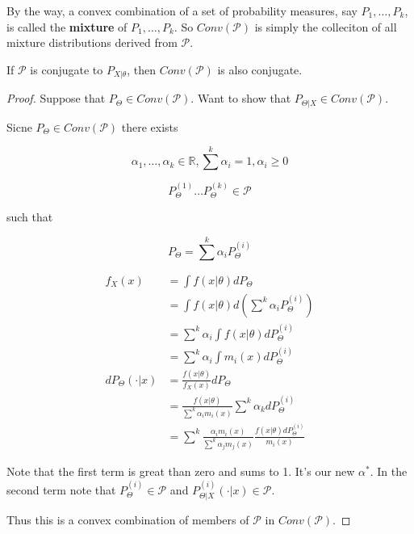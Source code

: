 \documentclass[11pt,fleqn]{book} %
\begin{document}
\begin{remark}
					By the way, a convex combination of a set of probability measures, say $P_1, \dots, P_k$, is called the \textbf{mixture} of $P_1, \dots, P_k$. So $Conv(\mathcal{P})$ is simply the colleciton of all mixture distributions derived from $\mathcal{P}$. 
				\end{remark}

	\begin{theorem}
		If $\mathcal{P}$ is conjugate to $P_{X|\theta}$, then $Conv(\mathcal{P})$ is also conjugate. 


	\end{theorem}

	\begin{proof}
		Suppose that $P_\Theta \in Conv(\mathcal{P})$. Want to show that $P_{\Theta|X} \in Conv(\mathcal{P})$. 

		Sicne $P_\Theta \in Conv(\mathcal{P})$ there exists

				$$\alpha_1, \dots, \alpha_k \in \mathbb{R}, \sum^k \alpha_i = 1, \alpha_i \geq 0 $$

				$$P_\Theta^{(1)} \dots  P_\Theta^{(k)} \in \mathcal{P}$$

		such that

				$$P_\Theta = \sum^k \alpha_i P_\Theta^{(i)} $$

				\begin{align*}
					f_X(x) &= \int f(x|\theta) dP_\Theta\\
							&= \int f(x|\theta) d(\sum^k \alpha_i P_\Theta^{(i)})\\
							&= \sum^k \alpha_i \int f(x|\theta) dP_\Theta^{(i)}\\
							&=\sum^k \alpha_i \int m_i(x) dP_\Theta^{(i)}\\
						dP_\Theta(\cdot|x)	&= \frac{f(x|\theta)}{f_X(x)} dP_\Theta\\
						&=\frac{f(x|\theta)}{\sum^k \alpha_i m_i(x)} \sum^k \alpha_k d P_\Theta^{(i)}\\
						&=\sum^k \frac{\alpha_i m_i(x)}{\sum^k \alpha_j m_j(x)} \frac{f(x|\theta)dP_\Theta^{(i)}}{m_i(x)}
				\end{align*}

				Note that the first term is great than zero and sums to 1. It's our new $\alpha^*$. In the second term note that $P_\Theta^{(i)} \in \mathcal{P}$ and $P_{\Theta|X}^{(i)}(\cdot|x) \in \mathcal{P}$. 

				Thus this is a convex combination of members of $\mathcal{P}$ in $Conv(\mathcal{P})$.  

				
	\end{proof}
\end{document}
